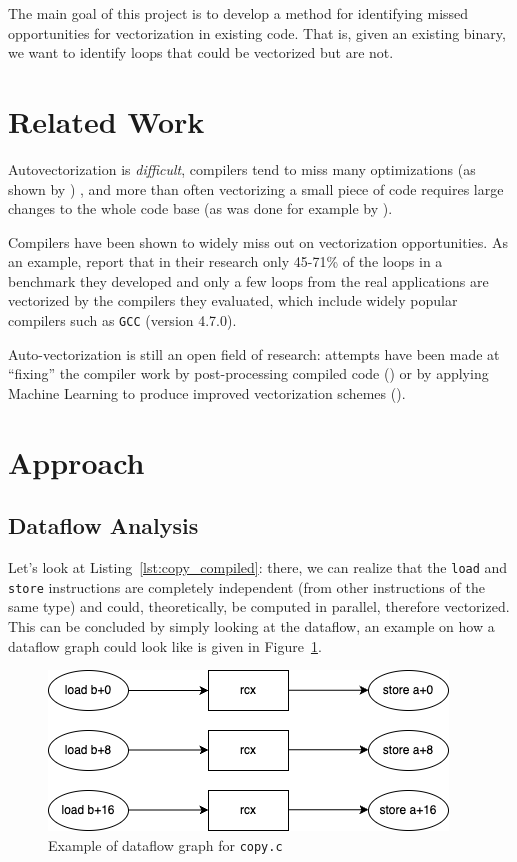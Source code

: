 \documentclass[acmsmall,review, nonacm]{acmart}
\begin{document}


\noindent The main goal of this project is to develop a method for identifying missed opportunities 
for vectorization in existing code. That is, given an existing binary, we want to identify 
loops that could be vectorized but are not.

\section{Related Work}
Autovectorization is \textit{difficult}, compilers tend to miss many optimizations (as shown by \citet{Feng2021})
, and more than often
vectorizing a small piece of code requires large changes to the whole code base 
(as was done for example by \citet{Chen22}).

Compilers have been shown to widely miss out on vectorization opportunities. As an example, \citet{Maleki2021} report that
in their research only 45-71\% of the loops in a benchmark they developed and only a few loops from the real applications 
are vectorized by the compilers they evaluated, which include widely popular compilers such as \texttt{GCC} (version 4.7.0).

Auto-vectorization is still an open field of research: attempts have been made at ``fixing'' the compiler work
by post-processing compiled code (\citet{Porpodas2021}) or by applying Machine Learning to produce improved vectorization schemes
(\citet{Mendis2019}).

\section{Approach}
\subsection{Dataflow Analysis}
Let's look at Listing~\ref{lst:copy_compiled}: there, we can realize that 
the \texttt{load} and \texttt{store} instructions are completely independent (from other instructions of the same type) 
and could, theoretically, be computed in parallel, therefore vectorized. This can be concluded by simply looking at the dataflow,
an example on how a dataflow graph could look like is given in Figure~\ref{fig:dataflow}.

\begin{figure}[h!]
  \includegraphics*[width=0.4\linewidth]{img/dataflow.png}
  \caption{Example of dataflow graph for \texttt{copy.c}}
  \label{fig:dataflow}
\end{figure}
\end{document}
